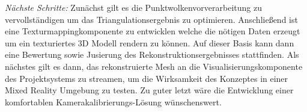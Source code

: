 
{\em Nächste Schritte: } Zunächst gilt es die Punktwolkenvorverarbeitung zu 
vervollständigen um das Triangulationsergebnis zu optimieren. Anschließend ist 
eine Texturmappingkomponente zu entwicklen welche die nötigen Daten erzeugt um 
ein texturiertes 3D Modell rendern zu können. Auf dieser Basis kann dann eine 
Bewertung sowie Jusierung des Rekonstruktionsergebnisses stattfinden. Als 
nächstes gilt es dann, das rekonstruierte Mesh an die Visualisierungskomponente 
des Projektsystems zu streamen, um die Wirksamkeit des Konzeptes in einer Mixed 
Reality Umgebung zu testen. Zu guter letzt wäre die Entwicklung einer komfortablen 
Kamerakalibrierungs-Lösung wünschenswert.


